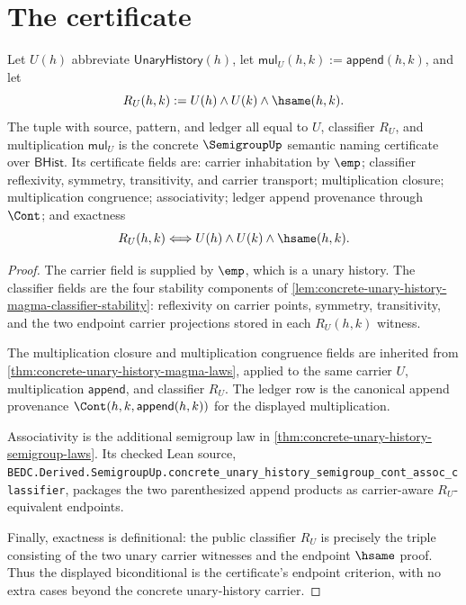 \section{The certificate}
\label{sec:semigroup-certificate}

\begin{theorem}
\label{thm:concrete-unary-history-semigroup-semantic-certificate}
Let $U(h)$ abbreviate $\mathsf{UnaryHistory}(h)$, let
$\mathsf{mul}_U(h,k):=\mathsf{append}(h,k)$, and let
$$
R_U(h,k):=U(h)\land U(k)\land\hsame(h,k).
$$
The tuple with source, pattern, and ledger all equal to $U$, classifier
$R_U$, and multiplication $\mathsf{mul}_U$ is the concrete $\SemigroupUp$
semantic naming certificate over $\mathsf{BHist}$. Its certificate fields are:
carrier inhabitation by $\emp$; classifier reflexivity, symmetry,
transitivity, and carrier transport; multiplication closure; multiplication
congruence; associativity; ledger append provenance through $\Cont$; and
exactness
$$
R_U(h,k)\Longleftrightarrow U(h)\land U(k)\land\hsame(h,k).
$$
\end{theorem}
\begin{proof}
The carrier field is supplied by $\emp$, which is a unary history. The
classifier fields are the four stability components of
\autoref{lem:concrete-unary-history-magma-classifier-stability}: reflexivity on
carrier points, symmetry, transitivity, and the two endpoint carrier
projections stored in each $R_U(h,k)$ witness.

The multiplication closure and multiplication congruence fields are inherited
from \autoref{thm:concrete-unary-history-magma-laws}, applied to the same
carrier $U$, multiplication $\mathsf{append}$, and classifier $R_U$. The ledger
row is the canonical append provenance
$\Cont(h,k,\mathsf{append}(h,k))$ for the displayed multiplication.

Associativity is the additional semigroup law in
\autoref{thm:concrete-unary-history-semigroup-laws}. Its checked Lean source,
\texttt{BEDC.Derived.SemigroupUp.concrete\_unary\_history\_semigroup\_cont\_assoc\_classifier},
packages the two parenthesized append products as carrier-aware $R_U$-equivalent
endpoints.

Finally, exactness is definitional: the public classifier $R_U$ is precisely the
triple consisting of the two unary carrier witnesses and the endpoint
$\hsame$ proof. Thus the displayed biconditional is the certificate's endpoint
criterion, with no extra cases beyond the concrete unary-history carrier.
\end{proof}

